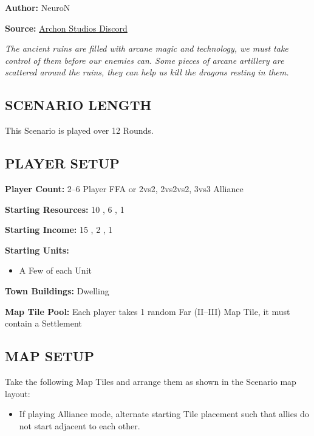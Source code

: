 
\begin{multicols}{2}

\textbf{Author:} NeuroN

\textbf{Source:} \href{https://discord.com/channels/740870068178649108/1279029213839626313}{Archon Studios Discord}

\textit{The ancient ruins are filled with arcane magic and technology, we must take control of them before our enemies can.
Some pieces of arcane artillery are scattered around the ruins, they can help us kill the dragons resting in them.}

\subsection*{\MakeUppercase{Scenario Length}}
This Scenario is played over 12 Rounds.

\subsection*{\MakeUppercase{Player Setup}}
\textbf{Player Count:} 2--6 Player FFA or 2vs2, 2vs2vs2, 3vs3 Alliance

\textbf{Starting Resources:} 10 , 6 , 1 

\textbf{Starting Income:} 15 , 2 , 1 

\textbf{Starting Units:}
\begin{itemize}
  \item A Few of each  Unit
\end{itemize}

\textbf{Town Buildings:}  Dwelling

\textbf{Map Tile Pool:} Each player takes 1 random Far (II--III) Map Tile, it must contain a Settlement

\subsection*{\MakeUppercase{Map Setup}}
Take the following Map Tiles and arrange them as shown in the Scenario map layout:

\begin{itemize}
  \item If playing Alliance mode, alternate starting Tile placement such that allies do not start adjacent to each other.
\end{itemize}


\end{multicols}
